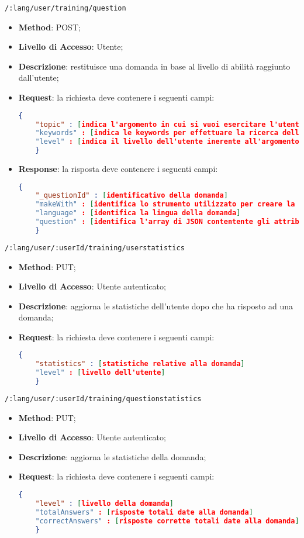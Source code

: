 \item \texttt{/:lang/user/training/question}
\begin{itemize}
	\item \textbf{Method}: POST;
	\item \textbf{Livello di Accesso}: Utente;
	\item \textbf{Descrizione}: restituisce una domanda in base al livello di abilità raggiunto dall'utente;
	\item \textbf{Request}: la richiesta deve contenere i seguenti campi:
	\begin{lstlisting}[language=json,firstnumber=1]
	{
	"topic" : [indica l'argomento in cui si vuoi esercitare l'utente]
	"keywords" : [indica le keywords per effettuare la ricerca della domanda]
	"level" : [indica il livello dell'utente inerente all'argomento scelto]
	}
	\end{lstlisting}
	\item \textbf{Response}: la risposta deve contenere i seguenti campi:
	\begin{lstlisting}[language=json,firstnumber=1]
	{
	"_questionId" : [identificativo della domanda]
	"makeWith" : [identifica lo strumento utilizzato per creare la domanda]
	"language" : [identifica la lingua della domanda]
	"question" : [identifica l'array di JSON contentente gli attributi che formano una domanda]
	}
	\end{lstlisting}
\end{itemize}

\item \texttt{/:lang/user/:userId/training/userstatistics}
\begin{itemize}
	\item \textbf{Method}: PUT;
	\item \textbf{Livello di Accesso}: Utente autenticato;
	\item \textbf{Descrizione}: aggiorna le statistiche dell'utente dopo che ha risposto ad una domanda;
	\item \textbf{Request}: la richiesta deve contenere i seguenti campi:
	\begin{lstlisting}[language=json,firstnumber=1]
	{
	"statistics" : [statistiche relative alla domanda]
	"level" : [livello dell'utente]
	}
	\end{lstlisting}	
\end{itemize}

\item \texttt{/:lang/user/:userId/training/questionstatistics}
\begin{itemize}
	\item \textbf{Method}: PUT;
	\item \textbf{Livello di Accesso}: Utente autenticato;
	\item \textbf{Descrizione}: aggiorna le statistiche della domanda;
	\item \textbf{Request}: la richiesta deve contenere i seguenti campi:
	\begin{lstlisting}[language=json,firstnumber=1]
	{
	"level" : [livello della domanda]
	"totalAnswers" : [risposte totali date alla domanda]
	"correctAnswers" : [risposte corrette totali date alla domanda]
	}
	\end{lstlisting}
\end{itemize}

